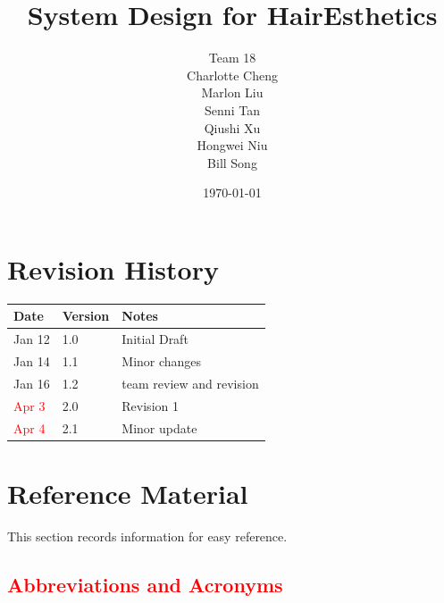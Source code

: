 \documentclass[12pt, titlepage]{article}
\begin{document}
\title{System Design for HairEsthetics}

\author{Team 18 \\ Charlotte Cheng
        \\ Marlon Liu
        \\ Senni Tan
        \\ Qiushi Xu
        \\ Hongwei Niu
        \\ Bill Song
}

\date{\today}

\maketitle


\section{Revision History}

\begin{tabularx}{\textwidth}{p{3cm}p{2cm}X}
\toprule {\bf Date} & {\bf Version} & {\bf Notes}\\
\midrule
Jan 12 & 1.0 & Initial Draft\\
Jan 14 & 1.1 & Minor changes\\
Jan 16 & 1.2 & team review and revision \\
\textcolor{red}{Apr 3} & 2.0 & Revision 1 \\
\textcolor{red}{Apr 4} & 2.1 & Minor update\\
\bottomrule
\end{tabularx}

\newpage

\section{Reference Material}

This section records information for easy reference.

\subsection{\textcolor{red}{Abbreviations and Acronyms}}
\end{document}
